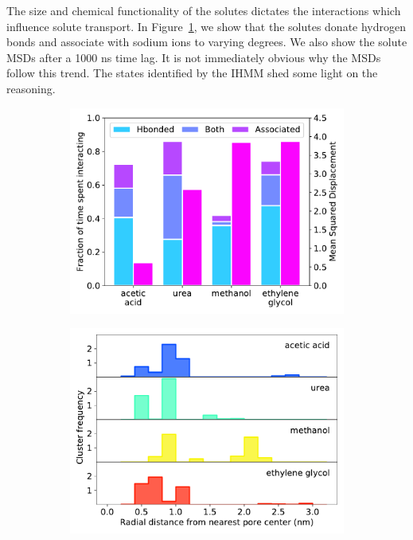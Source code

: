 \documentclass[journal=jpcbfk,manuscript=article]{achemso}
\begin{document}
  The size and chemical functionality of the solutes dictates the interactions which
  influence solute transport. In Figure~\ref{fig:hbonds_assoc_summary}, we show that
  the solutes donate hydrogen bonds and associate with sodium ions to varying degrees.
  We also show the solute MSDs after a 1000 ns time lag. It is not immediately obvious
  why the MSDs follow this trend. 
  The states identified by the IHMM shed
  some light on the reasoning.
  
  \begin{figure}
  \centering
  \begin{subfigure}{0.45\textwidth}
  \includegraphics[width=\textwidth]{hbonds_assoc_summary.pdf}
  \caption{}\label{fig:hbonds_assoc_summary}
  \end{subfigure}
  \begin{subfigure}{0.45\textwidth}
  \includegraphics[width=\textwidth]{rdf_summary.pdf}

\end{subfigure}
\end{figure}
\end{document}
